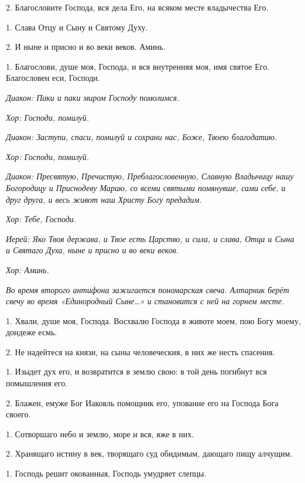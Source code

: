 2. Благословите Господа, вся дела Его, на всяком месте владычества Его. 


1. Слава Отцу и Сыну и Святому Духу. 


2. И ныне и присно и во веки веков. Аминь. 


1. Благослови, душе моя, Господа, и вся внутренняя моя, имя святое Его. Благословен еси, Господи.




\medskip\itshape Диакон:\normalfont{} Паки и паки миром Господу помолимся. 


\itshape Хор:\normalfont{} Господи, помилуй. 


\itshape Диакон:\normalfont{} Заступи, спаси, помилуй и сохрани нас, Боже, Твоею благодатию. 


\itshape Хор:\normalfont{} Господи, помилуй. 


\itshape Диакон:\normalfont{} Пресвятую, Пречистую, Преблагословенную, Славную Владычицу нашу Богородицу и Приснодеву Марию, со всеми святыми помянувше, сами себе, и друг друга, и весь живот наш Христу Богу предадим. 


\itshape Хор:\normalfont{} Тебе, Господи. 


\itshape Иерей:\normalfont{} Яко Твоя держава, и Твое есть Царство, и сила, и слава, Отца и Сына и Святаго Духа, ныне и присно и во веки веков. 


\itshape Хор:\normalfont{} Аминь. 


\itshape Во время второго антифона зажигается пономарская свеча. Алтарник берёт свечу во время «Единородный Сыне…» и становится с ней на горнем месте.\normalfont{}




1. Хвали, душе моя, Господа. Восхвалю Господа в животе моем, пою Богу моему, дондеже есмь. 


2. Не надейтеся на князи, на сыны человеческия, в них же несть спасения. 


1. Изыдет дух его, и возвратится в землю свою: в той день погибнут вся помышления его. 


2. Блажен, емуже Бог Иаковль помощник его, упование его на Господа Бога своего. 


1. Сотворшаго небо и землю, море и вся, яже в них. 


2. Хранящаго истину в век, творящаго суд обидимым, дающаго пищу алчущим. 


1. Господь решит окованныя, Господь умудряет слепцы. 


